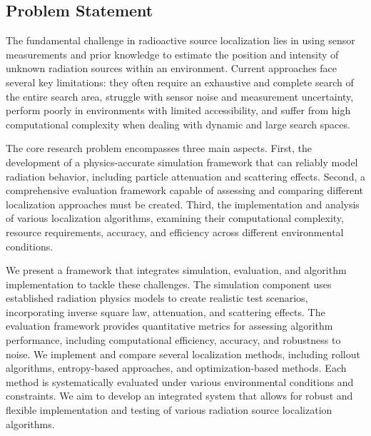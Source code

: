 \documentclass[../report.tex]{subfiles}
\begin{document}
    \subsection{Problem Statement}
    \label{sec:introduction:problem_statement}

    The fundamental challenge in radioactive source localization lies in using sensor measurements and prior knowledge to estimate the position and intensity of unknown radiation 
    sources within an environment. Current approaches face several key limitations: they often require an exhaustive and complete search of the entire search area, struggle with sensor noise and measurement 
    uncertainty, perform poorly in environments with limited accessibility, and suffer from high computational complexity when dealing with dynamic and large search spaces.
   
    The core research problem encompasses three main aspects. First, the development of a physics-accurate simulation framework that can reliably model radiation behavior, including particle 
    attenuation and scattering effects. Second, a comprehensive evaluation framework capable of assessing and comparing different localization approaches must be created. Third, the 
    implementation and analysis of various localization algorithms, examining their computational complexity, resource requirements, accuracy, and efficiency across different environmental conditions.
    \label{sec:introduction:proposed_approach}

    We present a framework that integrates simulation, evaluation, and algorithm implementation to tackle these challenges. The simulation component uses established radiation physics models 
    to create realistic test scenarios, incorporating inverse square law, attenuation, and scattering effects. The evaluation framework provides quantitative metrics for assessing algorithm 
    performance, including computational efficiency, accuracy, and robustness to noise. We implement and compare several localization methods, including rollout algorithms, entropy-based 
    approaches, and optimization-based methods. Each method is systematically evaluated under various environmental conditions and constraints. We aim to develop an integrated system that 
    allows for robust and flexible implementation and testing of various radiation source localization algorithms.
\end{document}
